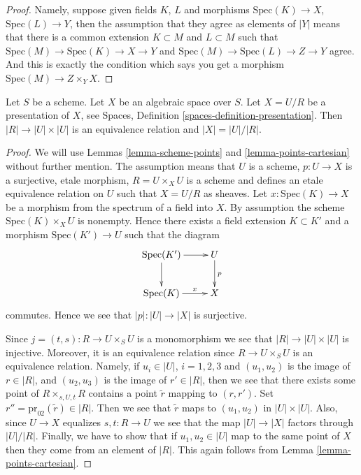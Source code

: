 \begin{proof}
Namely, suppose given fields $K$, $L$ and morphisms
$\text{Spec}(K) \to X$, $\text{Spec}(L) \to Y$, then the
assumption that they agree as elements of $|Y|$ means that
there is a common extension $K \subset M$ and $L \subset M$
such that
$\text{Spec}(M) \to \text{Spec}(K) \to X \to Y$ and
$\text{Spec}(M) \to \text{Spec}(L) \to Z \to Y$ agree.
And this is exactly the condition which says you get a
morphism $\text{Spec}(M) \to Z \times_Y X$.
\end{proof}

\begin{lemma}
\label{lemma-points-presentation}
Let $S$ be a scheme.
Let $X$ be an algebraic space over $S$.
Let $X = U/R$ be a presentation of $X$, see
Spaces, Definition \ref{spaces-definition-presentation}.
Then $|R| \to |U| \times |U|$ is an equivalence relation
and $|X| = |U|/|R|$.
\end{lemma}

\begin{proof}
We will use Lemmas \ref{lemma-scheme-points} and \ref{lemma-points-cartesian}
without further mention.
The assumption means that $U$ is a scheme, $p : U \to X$ is a
surjective, etale morphism, $R = U \times_X U$ is a scheme
and defines an etale equivalence relation on $U$ such that
$X = U/R$ as sheaves. Let $x : \text{Spec}(K) \to X$ be a morphism
from the spectrum of a field into $X$. By assumption the scheme
$\text{Spec}(K) \times_X U$ is nonempty. Hence there exists a
field extension $K \subset K'$ and a morphism $\text{Spec}(K') \to U$
such that the diagram
$$
\xymatrix{
\text{Spec}(K') \ar[r] \ar[d] & U \ar[d]^p \\
\text{Spec}(K) \ar[r]^-x & X
}
$$
commutes. Hence we see that $|p| : |U| \to |X|$ is surjective.

\medskip\noindent
Since $j = (t, s) : R \to U \times_S U$ is a monomorphism we see that
$|R| \to |U| \times |U|$ is injective. Moreover, it is an equivalence
relation since $R \to U \times_S U$ is an equivalence relation.
Namely, if $u_i \in |U|$, $i = 1, 2, 3$ and $(u_1, u_2)$ is
the image of $r \in |R|$, and $(u_2, u_3)$ is the image of
$r' \in |R|$, then we see that there exists some point of
$R \times_{s, U, t} R$ contains a point $\tilde r$ mapping to
$(r, r')$. Set $r'' = \text{pr}_{02}(\tilde r) \in |R|$. Then we
see that $\tilde r$ maps to $(u_1, u_2)$ in $|U| \times |U|$.
Also, since $U \to X$ equalizes $s, t : R \to U$ we see that
the map $|U| \to |X|$ factors through $|U|/|R|$. Finally, we have
to show that if $u_1, u_2 \in |U|$ map to the same point of $X$
then they come from an element of $|R|$.
This again follows from Lemma \ref{lemma-points-cartesian}.
\end{proof}

